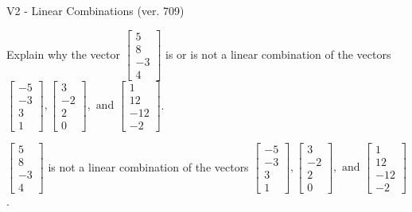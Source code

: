 \begin{exercise}
  \begin{exerciseTitle}V2 - Linear Combinations (ver. 709)\end{exerciseTitle}
  \begin{exerciseStatement}
    Explain why the vector \(\left[\begin{array}{c}
5 \\
8 \\
-3 \\
4
\end{array}\right]\)  is or is not a linear 
	combination of the vectors \(\left[\begin{array}{c}
-5 \\
-3 \\
3 \\
1
\end{array}\right] , \left[\begin{array}{c}
3 \\
-2 \\
2 \\
0
\end{array}\right] , \text{ and } \left[\begin{array}{c}
1 \\
12 \\
-12 \\
-2
\end{array}\right]\).
	


  \end{exerciseStatement}
  \begin{exerciseAnswer}
   \(\left[\begin{array}{c}
5 \\
8 \\
-3 \\
4
\end{array}\right]\) 
  	 is not  
	a linear combination of the vectors \(\left[\begin{array}{c}
-5 \\
-3 \\
3 \\
1
\end{array}\right] , \left[\begin{array}{c}
3 \\
-2 \\
2 \\
0
\end{array}\right] , \text{ and } \left[\begin{array}{c}
1 \\
12 \\
-12 \\
-2
\end{array}\right]\).

	
  


  \end{exerciseAnswer}
\end{exercise}